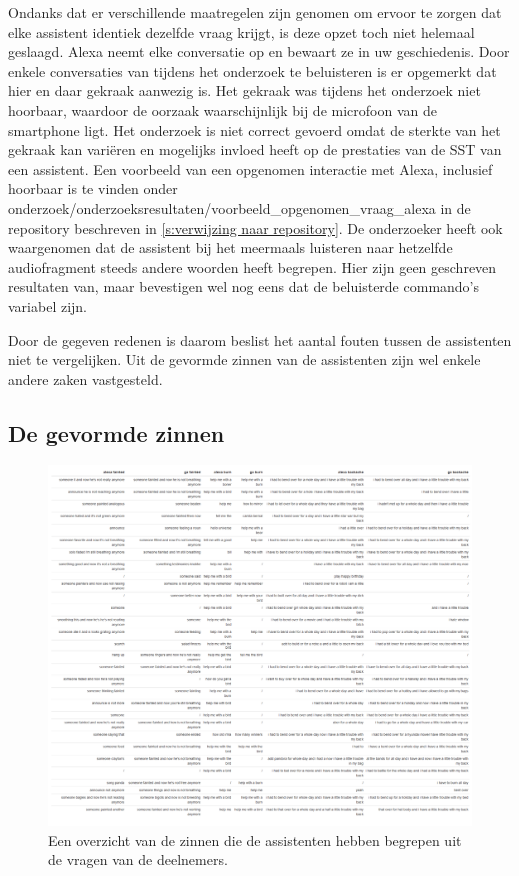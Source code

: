Ondanks dat er verschillende maatregelen zijn genomen om ervoor te zorgen dat elke assistent identiek dezelfde vraag krijgt, is deze opzet toch niet helemaal geslaagd. Alexa neemt elke conversatie op en bewaart ze in uw geschiedenis. Door enkele conversaties van tijdens het onderzoek te beluisteren is er opgemerkt dat hier en daar gekraak aanwezig is. Het gekraak was tijdens het onderzoek niet hoorbaar, waardoor de oorzaak waarschijnlijk bij de microfoon van de smartphone ligt. Het onderzoek is niet correct gevoerd omdat de sterkte van het gekraak kan variëren en mogelijks invloed heeft op de prestaties van de SST van een assistent. Een voorbeeld van een opgenomen interactie met Alexa, inclusief hoorbaar is te vinden onder onderzoek/onderzoeksresultaten/voorbeeld\_opgenomen\_vraag\_alexa in de repository beschreven in \ref{s:verwijzing naar repository}.
De onderzoeker heeft ook waargenomen dat de assistent bij het meermaals luisteren naar hetzelfde audiofragment steeds andere woorden heeft begrepen. Hier zijn geen geschreven resultaten van, maar bevestigen wel nog eens dat de beluisterde commando's variabel zijn.

Door de gegeven redenen is daarom beslist het aantal fouten tussen de assistenten niet te vergelijken. Uit de gevormde zinnen van de assistenten zijn wel enkele andere zaken vastgesteld.

\subsection{De gevormde zinnen}
\begin{figure}[H]
    \centering
    \includegraphics[width=1\linewidth]{../onderzoek/onderzoeksresultaten/vergelijking_tts_alle_teksten/tabel_alle_teksten}
    \caption{Een overzicht van de zinnen die de assistenten hebben begrepen uit de vragen van de deelnemers.}
    \label{fig:tabel-alle-teksten}
\end{figure}

